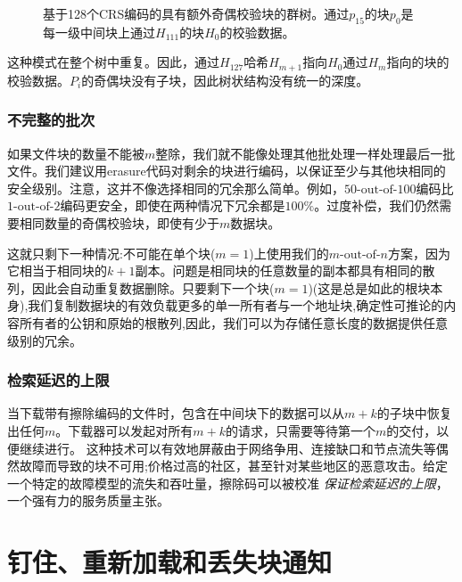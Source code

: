 \begin{figure}[htbp]
   \centering
   \resizebox{1\textwidth}{!}{
        
   }
   \caption[群哈希擦除\statusgreen]{基于128个CRS编码的具有额外奇偶校验块的群树。通过$p_{15}$的块$p_{0}$是每一级中间块上通过$H_{111}$的块$H_0 $的校验数据。}
   \label{fig:Swarm-hash-erasure}
\end{figure}


这种模式在整个树中重复。因此，通过$H_{127}$哈希$H_{m+1}$指向$H_0$通过$H_{m}$指向的块的校验数据。$P_i$的奇偶块没有子块，因此树状结构没有统一的深度。

\subsubsection{不完整的批次}

如果文件块的数量不能被$m$整除，我们就不能像处理其他批处理一样处理最后一批文件。我们建议用erasure代码对剩余的块进行编码，以保证至少与其他块相同的安全级别。注意，这并不像选择相同的冗余那么简单。例如，$50\text{-out-of-}100$编码比$1\text{-out-of-}2$编码更安全，即使在两种情况下冗余都是$100\%$。过度补偿，我们仍然需要相同数量的奇偶校验块，即使有少于$m$数据块。

这就只剩下一种情况:不可能在单个块($m=1$)上使用我们的$m\text{-out-of-}n$方案，因为它相当于相同块的$k+1$副本。问题是相同块的任意数量的副本都具有相同的散列，因此会自动重复数据删除。只要剩下一个块($m=1$)(这是总是如此的根块本身),我们复制数据块的有效负载更多的单一所有者与一个地址块,确定性可推论的内容所有者的公钥和原始的根散列,因此，我们可以为存储任意长度的数据提供任意级别的冗余。

\subsubsection{检索延迟的上限}

当下载带有擦除编码的文件时，包含在中间块下的数据可以从$m+k$的子块中恢复出任何$m$。下载器可以发起对所有$m+k$的请求，只需要等待第一个$m$的交付，以便继续进行。
这种技术可以有效地屏蔽由于网络争用、连接缺口和节点流失等偶然故障而导致的块不可用;价格过高的社区，甚至针对某些地区的恶意攻击。给定一个特定的故障模型的流失和吞吐量，擦除码可以被校准
\emph{保证检索延迟的上限}，一个强有力的服务质量主张。





\section{钉住、重新加载和丢失块通知\statusyellow}\label{sec:reupload}

